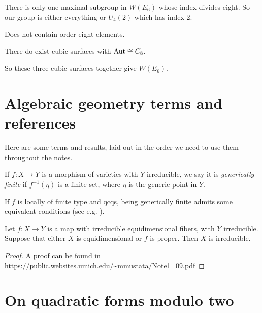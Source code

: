 \documentclass[11pt]{amsart}
\begin{document}
\begin{fact} There is only one maximal subgroup in $W(E_6)$ whose index divides eight. So our group is either everything or $U_4(2)$ which has index 2.
\end{fact}

\begin{fact} Does not contain order eight elements.
\end{fact}

There do exist cubic surfaces with $\mathrm{Aut} \cong C_8$.

So these three cubic surfaces together give $W(E_6)$.




\appendix

\section{Algebraic geometry terms and references}

Here are some terms and results, laid out in the order we need to use them throughout the notes.

\begin{definition}
\label{def:generically-finite}
If $f \colon X \to Y$ is a morphism of varieties with $Y$ irreducible, we say it is \textit{generically finite} if $f^{-1}(\eta)$ is a finite set, where $\eta$ is the generic point in $Y$.
\end{definition}

\begin{remark} If $f$ is locally of finite type and qcqs, being generically finite admits some equivalent conditions (see e.g. \cite[02NW]{Stacks}).
\end{remark}

\begin{proposition}\label{prop:irred-criterion}
Let $f\colon X\to Y$ is a map with irreducible equidimensional fibers, with $Y$ irreducible. Suppose that either $X$ is equidimensional or $f$ is proper. Then $X$ is irreducible.
\end{proposition}
\begin{proof} A proof can be found in \url{https://public.websites.umich.edu/~mmustata/Note1_09.pdf}
\end{proof}

\section{On quadratic forms modulo two}
\end{document}
